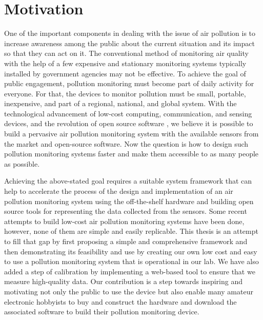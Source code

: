 \section{Motivation}

One of the important components in dealing with the issue of air pollution is to increase awareness among the public about the current situation and its impact so that they can act on it. The conventional method of monitoring air quality with the help of a few expensive and stationary monitoring systems typically installed by government agencies may not be effective. To achieve the goal of public engagement, pollution monitoring must become part of daily activity for everyone. For that, the devices to monitor pollution must be small, portable, inexpensive, and part of a regional, national, and global system. With the technological advancement of low-cost computing, communication, and sensing devices, and the revolution of open source software \cite{Anthes2016}, we believe it is possible to build a pervasive air pollution monitoring system with the available sensors from the market and open-source software. Now the question is how to design such pollution monitoring systems faster and make them accessible to as many people as possible. 

\par

Achieving the above-stated goal requires a suitable system framework that can help to accelerate the process of the design and implementation of an air pollution monitoring system using the off-the-shelf hardware and building open source tools for representing the data collected from the sensors. Some recent attempts to build low-cost air pollution monitoring systems have been done, however, none of them are simple and easily replicable. This thesis is an attempt to fill that gap by first proposing a simple and comprehensive framework and then demonstrating its feasibility and use by creating our own low cost and easy to use a pollution monitoring system that is operational in our lab. We have also added a step of calibration by implementing a web-based tool to ensure that we measure high-quality data. Our contribution is a step towards inspiring and motivating not only the public to use the device but also enable many amateur electronic hobbyists to buy and construct the hardware and download the associated software to build their pollution monitoring device.

